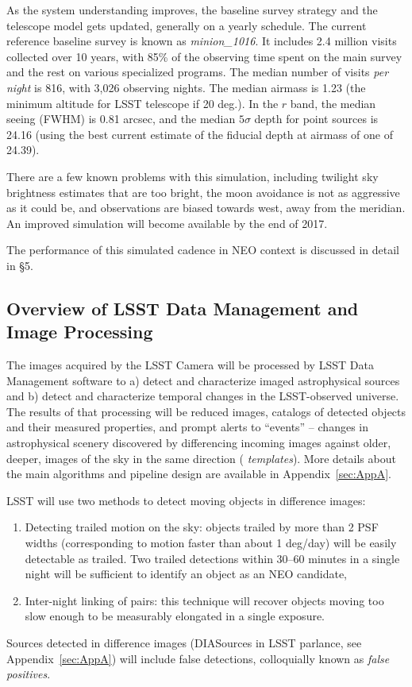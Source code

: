As the system understanding improves, the baseline survey strategy and the telescope model gets updated, generally on a yearly schedule. The current reference baseline survey is known as {\it minion\_1016}. It includes 2.4
million visits collected over 10 years, with 85\% of the observing time spent on the 
main survey and the rest on various specialized programs. The median number of visits
{\it per night} is 816, with 3,026 observing nights. The median airmass is 1.23 (the
minimum altitude for LSST telescope if 20 deg.). In the $r$ band, the median seeing 
(FWHM) is 0.81 arcsec, and the median $5\sigma$ depth for point sources is 24.16 
(using the best current estimate of the fiducial depth at airmass of one of 24.39). 

There are a few known problems with this simulation, including twilight sky brightness
estimates that are too bright, the moon avoidance is not as aggressive as it could be,
and observations are biased towards west, away from the meridian. An improved 
simulation will become available by the end of 2017. 

The performance of this simulated cadence in NEO context is discussed in detail in \S5. 


\subsection{Overview of LSST  Data Management and Image Processing} 

The images acquired by the LSST Camera will be processed by LSST Data Management
software \cite{juric15} to a) detect and characterize imaged
astrophysical sources and b) detect and characterize temporal changes
in the LSST-observed universe. The results of that processing will be
reduced images, catalogs of detected objects and their measured properties, and 
prompt alerts to ``events'' -- changes in astrophysical scenery discovered by differencing 
incoming images against older, deeper, images of the sky in the same direction ({\em
templates}). More details about the main algorithms and pipeline design are available
in Appendix~\ref{sec:AppA}. 

LSST will use two methods to detect moving objects in difference images: 
\begin{enumerate}
\item Detecting trailed motion on the sky: objects trailed by more
  than 2 PSF widths (corresponding to motion faster than about 1
  deg/day) will be easily detectable as trailed.  Two trailed
  detections within 30--60 minutes in a single night will be
  sufficient to identify an object as an NEO candidate,
\item Inter-night linking of pairs: this technique will recover
  objects moving too slow enough to be measurably elongated in 
  a single exposure. 
\end{enumerate} 


Sources detected in difference images (DIASources in LSST parlance, see Appendix~\ref{sec:AppA})
will include false detections, colloquially known as {\it false positives}. 

